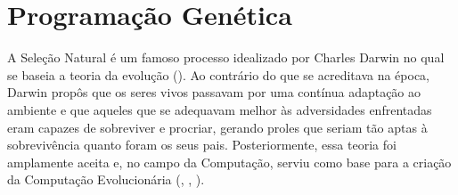 



\section{Programação Genética}
\label{sec::pg}

A Seleção Natural é um famoso processo idealizado por Charles Darwin no qual se baseia a teoria da evolução (\cite{Darwin1859}). Ao contrário do que se acreditava na época, Darwin propôs que os seres vivos passavam por uma contínua adaptação ao ambiente e que aqueles que se adequavam melhor às adversidades enfrentadas eram capazes de sobreviver e procriar, gerando proles que seriam tão aptas à sobrevivência quanto foram os seus pais. 
Posteriormente, essa teoria foi amplamente aceita e, no campo da Computação, serviu como base para a criação da Computação Evolucionária (\cite{Barricelli55}, \cite{Fraser57}, \cite{Rechenberg73}).

